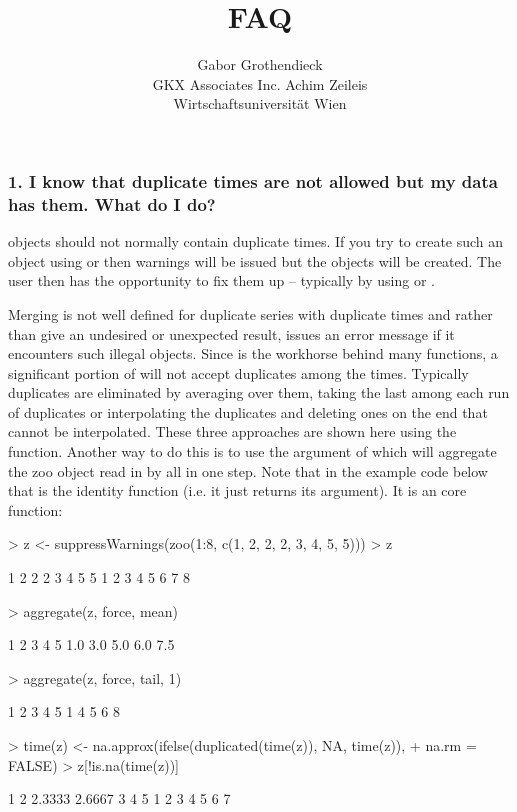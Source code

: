 \documentclass[article,nojss]{jss}
\author{Gabor Grothendieck\\GKX Associates Inc. \And
        Achim Zeileis\\Wirtschaftsuniversit\"at Wien}
\title{\pkg{zoo} FAQ}
\newcommand{\mysection}[1]{\subsubsection[#1]{\textbf{#1}}}
\begin{document}



\mysection{1. I know that duplicate times are not allowed but my data has them.  What do I do?}

 objects should not normally contain duplicate times.
If you try to create such an object using
 or  then warnings will be issued but
the objects will be created.   The user then has the opportunity
to fix them up -- typically by using 
or .  

Merging is not well defined for duplicate series with duplicate
times and rather than give an undesired or unexpected result,
 issues an error message if it encounters
such illegal objects.   Since 
is the workhorse behind many  functions, a significant
portion of  will not accept
duplicates among the times.  Typically duplicates are eliminated by
averaging over them, taking the last among each run of duplicates
or interpolating the duplicates and deleting ones on the end that
cannot be interpolated.  These three approaches are shown here
using the  function.  Another way to do this
is to use the  argument of  which 
will aggregate the zoo object read in by  all in one step.
Note
that in the example code below that  is the identity 
function (i.e. it just returns its argument).  It 
is an  core function:

\begin{Schunk}
\begin{Sinput}
> z <- suppressWarnings(zoo(1:8, c(1, 2, 2, 2, 3, 4, 5, 5)))
> z
\end{Sinput}
\begin{Soutput}
1 2 2 2 3 4 5 5 
1 2 3 4 5 6 7 8 
\end{Soutput}
\begin{Sinput}
> aggregate(z, force, mean)
\end{Sinput}
\begin{Soutput}
  1   2   3   4   5 
1.0 3.0 5.0 6.0 7.5 
\end{Soutput}
\begin{Sinput}
> aggregate(z, force, tail, 1)
\end{Sinput}
\begin{Soutput}
1 2 3 4 5 
1 4 5 6 8 
\end{Soutput}
\begin{Sinput}
> time(z) <- na.approx(ifelse(duplicated(time(z)), NA, time(z)), 
+     na.rm = FALSE)
> z[!is.na(time(z))]
\end{Sinput}
\begin{Soutput}
     1      2 2.3333 2.6667      3      4      5 
     1      2      3      4      5      6      7 
\end{Soutput}
\end{Schunk}
\end{document}
